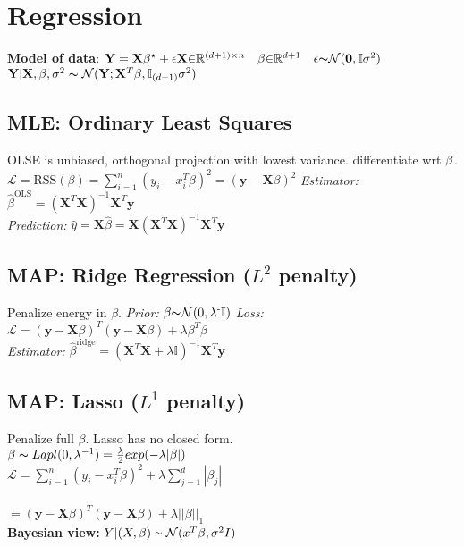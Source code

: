 \section*{Regression}
\textbf{Model of data}:
$\mathbf{Y}=\mathbf{X}\beta^\star +\epsilon \\
\mathbf{X}{\in}\mathbb{R}^{(d{+}1){\times} n} \quad \beta {\in} \mathbb{R}^{d{+}1} \quad \epsilon {\thicksim} \mathcal{N}(\mathbf{0},\mathbb{I}\sigma^2)$\\
$\mathbf{Y}|\mathbf{X},\beta, \sigma^2 \thicksim \mathcal{N}(\mathbf{Y}; \mathbf{X}^T\beta, \mathbb{I}_{(d+1)}\sigma^2)$



\subsection*{MLE: Ordinary Least Squares}
OLSE is unbiased, orthogonal projection with lowest
variance. differentiate wrt $\beta$.\\
$\mathcal{L} {=} \text{RSS}(\beta){=}\sum_{i{=}1}^n(y_i{-}x_i^T\beta)^2{=}(\mathbf{y}{-}\mathbf{X}\beta)^2$
\textit{Estimator:} \ $\hat{\beta}^\text{OLS} = (\mathbf{X}^T\mathbf{X})^{-1}\mathbf{X}^{T}\mathbf{y}$\\
\textit{Prediction:} $\hat{y}{=}\mathbf{X}\hat{\beta}{=}\mathbf{X}(\mathbf{X}^T\mathbf{X})^{-1}\mathbf{X}^{T}\mathbf{y}$


\subsection*{MAP: Ridge Regression ($L^2$ penalty)}
Penalize energy in $\beta$. \textit{Prior:} $\beta{\thicksim}\mathcal{N}(0, \lambda^{\text{-}}\mathbb{I})$
\textit{Loss:} $\mathcal{L} = (\mathbf{y}-\mathbf{X}\beta)^T(\mathbf{y}-\mathbf{X}\beta)+\lambda\beta^T\beta$\\
\textit{Estimator:} $\hat{\beta}^\text{ridge} = (\mathbf{X}^T\mathbf{X}+\lambda\mathbb{I})^{-1}\mathbf{X}^{T}\mathbf{y}$ \\

\subsection*{MAP: Lasso ($L^1$ penalty)}
Penalize full $\beta$. Lasso has no closed form.\\
$\beta \thicksim Lapl(0, \lambda^{-1}) = \frac{\lambda}{2} exp(-\lambda |\beta|)$ \\
$\mathcal{L} = \sum_{i=1}^n(y_i-x_i^T\beta)^2+\lambda\sum_{j=1}^d|\beta_j| $\\\\
$=(\mathbf{y}-\mathbf{X}\beta)^T(\mathbf{y}-\mathbf{X}\beta)+\lambda||\beta||_1$\\
\textbf{Bayesian view:} $Y|(X, \beta) \smallsim \mathcal{N}(x^T\beta, \sigma^2 I)$\\

